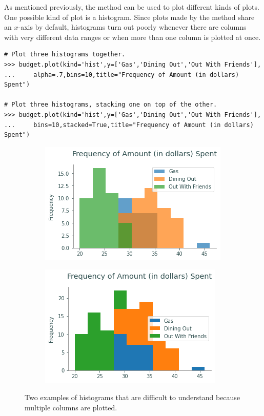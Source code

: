 As mentioned previously, the  method can be used to plot different kinds of plots.
One possible kind of plot is a histogram.
Since plots made by the  method share an $x$-axis by default, histograms turn out poorly whenever there are columns with very different data ranges or when more than one column is plotted at once.

\begin{lstlisting}
# Plot three histograms together.
>>> budget.plot(kind='hist',y=['Gas','Dining Out','Out With Friends'],
... 	alpha=.7,bins=10,title="Frequency of Amount (in dollars) Spent")

# Plot three histograms, stacking one on top of the other.
>>> budget.plot(kind='hist',y=['Gas','Dining Out','Out With Friends'],
...		bins=10,stacked=True,title="Frequency of Amount (in dollars) Spent")
\end{lstlisting}

\begin{figure}[H] %
\centering
\begin{subfigure}{.49\textwidth}
    \includegraphics[width=\textwidth]{figures/bad_hist_unstacked.pdf}
\end{subfigure}
%
\begin{subfigure}{.49\textwidth}
    \includegraphics[width=\textwidth]{figures/bad_hist_stacked.pdf}
\end{subfigure}
\caption{Two examples of histograms that are difficult to understand because multiple columns are plotted.}
\end{figure}

